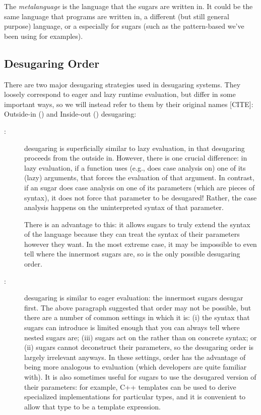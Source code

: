 The \emph{metalanguage} is the language that the sugars are written
in. It could be the same language that programs are written in, a
different (but still general purpose) language, or a 
especially for sugars (such as the pattern-based
  we've been using for examples).


\subsection{Desugaring Order}\label{sec:taxonomy-order}

There are two major desugaring strategies used in desugaring systems.
They loosely correspond to eager and lazy runtime evaluation, but
differ in some important ways, so we will instead refer
to them by their original names [CITE]: Outside-in () and
Inside-out () desugaring:
\begin{description}
\item[:]  desugaring is superficially similar to lazy
  evaluation, in that desugaring proceeds from the outside in.
  However, there is one crucial difference: in lazy evaluation, if a
  function uses (e.g., does case analysis on) one of its (lazy)
  arguments, that forces the evaluation of that argument. In contrast,
  if an  sugar does case analysis on one of its
  parameters (which are pieces of syntax), it does not force that
  parameter to be desugared! Rather, the case analysis happens on the
  uninterpreted syntax of that parameter.

  There is an advantage to this: it allows sugars to truly extend the
  syntax of the language because they can treat the syntax of their
  parameters however they want.
  In the most extreme case, it may be impossible
  to even tell where the innermost sugars are, so  is the only
  possible desugaring order.
\item[:]  desugaring is similar to eager evaluation: the
  innermost sugars desugar first. The above paragraph suggested that
   order may not be possible, but there are a number of common
  settings in which it is: (i) the syntax that sugars can introduce is
  limited enough that you can always tell where nested sugars are;
  (iii) sugars act on the  rather than on concrete syntax; or
  (ii) sugars cannot deconstruct their parameters, so the desugaring
  order is largely irrelevant anyways. In these settings, 
  order has the advantage of being more analogous to evaluation (which
  developers are quite familiar with). It is
  also sometimes useful for sugars to use the desugared version of
  their parameters: for example, C++ templates can be used to derive
  specialized implementations for particular types, and it is
  convenient to allow that type to be a template expression.
\end{description}


